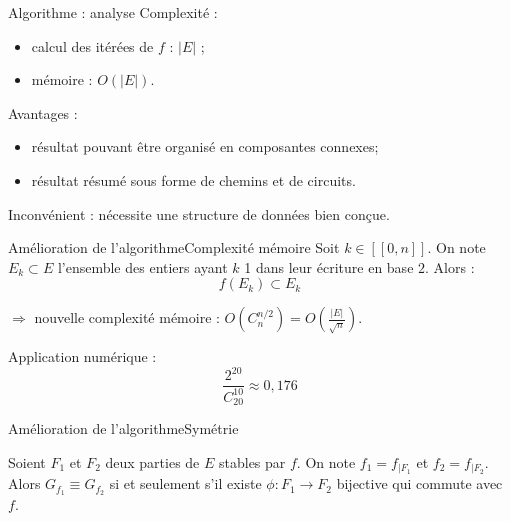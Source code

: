 \begin{frame}{Algorithme : analyse}
Complexit\'e :
\begin{itemize}
\item calcul des it\'er\'ees de $f$ : $|E|$ ;
\item m\'emoire : $O(|E|)$.
\end{itemize}
Avantages :
\begin{itemize}
\item r\'esultat pouvant \^etre organis\'e en composantes connexes;
\item r\'esultat r\'esum\'e sous forme de chemins et de circuits.
\end{itemize}
Inconv\'enient : n\'ecessite une structure de donn\'ees bien con\c cue.
\end{frame}

\begin{frame}{Am\'elioration de l'algorithme}{Complexit\'e m\'emoire}
Soit $k\in [\![0, n]\!]$. On note $E_{k}\subset E$ l'ensemble des entiers ayant $k$ 1 dans leur \'ecriture en base $2$. Alors : \[f(E_{k})\subset E_k\]

$\Longrightarrow$ nouvelle complexit\'e m\'emoire : $O(C^{n/2}_{n})=O(\frac{|E|}{\sqrt{n}})$.\par

\vspace*{1cm}

Application num\'erique : \[\frac{2^{20}}{C^{10}_{20}}\approx 0,176\]

\end{frame}

\begin{frame}{Am\'elioration de l'algorithme}{Sym\'etrie}
\begin{thm}
Soient $F_1$ et $F_2$ deux parties de $E$ stables par $f$. On note $f_{1}=f_{|F_{1}}$ et $f_{2}=f_{|F_{2}}$. Alors $G_{f_1}\equiv G_{f_2}$ si et seulement s'il existe $\phi:F_{1}\rightarrow F_{2}$ bijective qui commute avec $f$.
\end{thm}
\end{frame}

